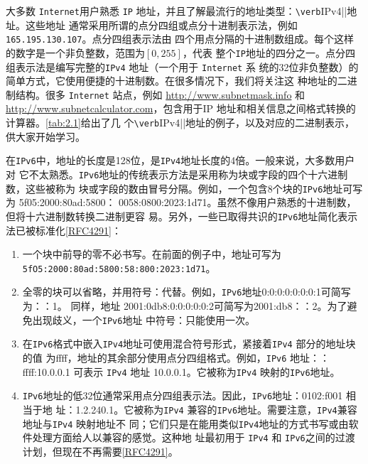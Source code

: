 大多数 \verb|Internet|用户熟悉 \verb|IP| 地址，并且了解最流行的地址类型：\verb|\verb|IPv4||地址。这些地址
通常采用所谓的点分四组或点分十进制表示法，例如 \verb|165.195.130.107|。点分四组表示法由
四个用点分隔的十进制数组成。每个这样的数字是一个非负整数，范围为$[0,255]$，代表
整个\verb|IP|地址的四分之一。点分四组表示法是编写完整的\verb|IPv4| 地址（一个用于 \verb|Internet| 系
统的32位非负整数）的简单方式，它使用便捷的十进制数。在很多情况下，我们将关注这
种地址的二进制结构。很多 \verb|Internet| 站点，例如 \url{http://www.subnetmask.info} 和
\url{http://www.subnetcalculator.com}，包含用于IP 地址和相关信息之间格式转换的计算器。\ref{tab:2.1}给出了几
个\verb|\verb|IPv4||地址的例子，以及对应的二进制表示，供大家开始学习。

在\verb|IPv6|中，地址的长度是128位，是\verb|IPv4|地址长度的4倍。一般来说，大多数用户对
它不太熟悉。\verb|IPv6|地址的传统表示方法是采用称为块或字段的四个十六进制数，这些被称为
块或字段的数由冒号分隔。例如，一个包含8个块的\verb|IPv6|地址可写为 5f05:2000:80ad:5800：
0058:0800:2023:1d71。虽然不像用户熟悉的十进制数，但将十六进制数转换二进制更容
易。另外，一些已取得共识的\verb|IPv6|地址简化表示法已被标准化\href{https://www.rfc-editor.org/rfc/rfc4291}{[RFC4291]}：

\begin{enumerate}
    \item 一个块中前导的零不必书写。在前面的例子中，地址可写为
    \verb|5fO5:2000:80ad:5800:58:800:2023:1d71|。
    
    \item 全零的块可以省略，并用符号：代替。例如，\verb|IPv6|地址0:0:0:0:0:0:0:1可简写为：：1。
    同样，地址 2001:0db8:0:0:0:0:0:2可简写为2001:db8：：2。为了避免出现歧义，一个\verb|IPv6|地址
    中符号：只能使用一次。
    
    \item 在\verb|IPv6|格式中嵌入\verb|IPv4|地址可使用混合符号形式，紧接着\verb|IPv4| 部分的地址块的值
    为ffff，地址的其余部分使用点分四组格式。例如，\verb|IPv6| 地址：：ffff:10.0.0.1 可表示 \verb|IPv4| 地址
    10.0.0.1。它被称为\verb|IPv4| 映射的\verb|IPv6|地址。
    
    \item \verb|IPv6|地址的低32位通常采用点分四组表示法。因此，\verb|IPv6|地址：0102:f001 相当于地
    址：1.2.240.1。它被称为\verb|IPv4| 兼容的\verb|IPv6|地址。需要注意，\verb|IPv4|兼容地址与\verb|IPv4| 映射地址不
    同；它们只是在能用类似\verb|IPv4|地址的方式书写或由软件处理方面给人以兼容的感觉。这种地
    址最初用于 \verb|IPv4| 和 \verb|IPv6|之间的过渡计划，但现在不再需要\href{https://www.rfc-editor.org/rfc/rfc4291}{[RFC4291]}。
\end{enumerate}

